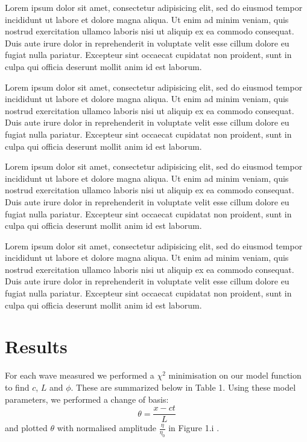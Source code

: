 \documentclass[10pt, twocolumn]{revtex4}    %
\begin{document}
Lorem ipsum dolor sit amet, consectetur adipisicing elit, sed do eiusmod tempor incididunt ut labore et dolore magna aliqua. Ut enim ad minim veniam, quis nostrud exercitation ullamco laboris nisi ut aliquip ex ea commodo consequat. Duis aute irure dolor in reprehenderit in voluptate velit esse cillum dolore eu fugiat nulla pariatur. Excepteur sint occaecat cupidatat non proident, sunt in culpa qui officia deserunt mollit anim id est laborum.


Lorem ipsum dolor sit amet, consectetur adipisicing elit, sed do eiusmod tempor incididunt ut labore et dolore magna aliqua. Ut enim ad minim veniam, quis nostrud exercitation ullamco laboris nisi ut aliquip ex ea commodo consequat. Duis aute irure dolor in reprehenderit in voluptate velit esse cillum dolore eu fugiat nulla pariatur. Excepteur sint occaecat cupidatat non proident, sunt in culpa qui officia deserunt mollit anim id est laborum.


Lorem ipsum dolor sit amet, consectetur adipisicing elit, sed do eiusmod tempor incididunt ut labore et dolore magna aliqua. Ut enim ad minim veniam, quis nostrud exercitation ullamco laboris nisi ut aliquip ex ea commodo consequat. Duis aute irure dolor in reprehenderit in voluptate velit esse cillum dolore eu fugiat nulla pariatur. Excepteur sint occaecat cupidatat non proident, sunt in culpa qui officia deserunt mollit anim id est laborum.

Lorem ipsum dolor sit amet, consectetur adipisicing elit, sed do eiusmod tempor incididunt ut labore et dolore magna aliqua. Ut enim ad minim veniam, quis nostrud exercitation ullamco laboris nisi ut aliquip ex ea commodo consequat. Duis aute irure dolor in reprehenderit in voluptate velit esse cillum dolore eu fugiat nulla pariatur. Excepteur sint occaecat cupidatat non proident, sunt in culpa qui officia deserunt mollit anim id est laborum.


\section{Results}
For each wave measured we performed a $\chi^2$ minimisation on our model function to find $c$, $L$ and $\phi$. These are summarized below in Table 1. Using these model parameters, we performed a change of basis:
\begin{equation}
  \theta = \frac{x - ct}{L}
\end{equation}
and plotted $\theta$ with normalised amplitude $\frac{\eta}{\eta_{0}}$ in Figure 1.i .
\end{document}
